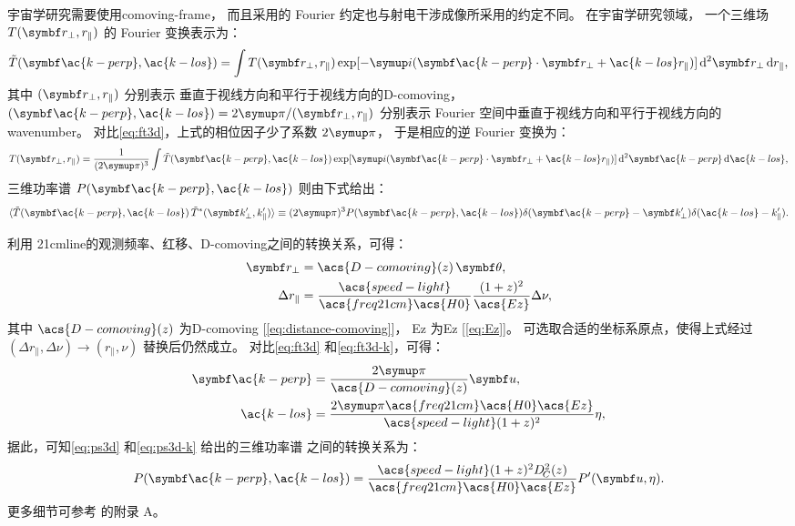 宇宙学研究需要使用\ac{comoving-frame}，
而且采用的 Fourier 约定也与射电干涉成像所采用的约定不同。
在宇宙学研究领域，
一个三维场 $T(\B{r}_{\perp}, r_{\parallel})$ 的 Fourier 变换表示为：
\begin{equation}
  \label{eq:ft3d-k}
  \tilde{T}(\B{\ac{k-perp}}, \ac{k-los}) =
    \int T(\B{r}_{\perp}, r_{\parallel})
    \exp[ -\Ci (\B{\ac{k-perp}} \cdot \B{r}_{\perp}
      + \ac{k-los} r_{\parallel}) ]
    \,\mathrm{d}^2\B{r}_{\perp} \,\D{r_{\parallel}} ,
\end{equation}
其中 $(\B{r}_{\perp}, r_{\parallel})$ 分别表示
垂直于视线方向和平行于视线方向的\acl{D-comoving}，
$(\B{\ac{k-perp}}, \ac{k-los}) = 2\Cpi / (\B{r}_{\perp}, r_{\parallel})$
分别表示 Fourier 空间中垂直于视线方向和平行于视线方向的\ac{wavenumber}。
对比\autoref{eq:ft3d}，上式的相位因子少了系数 $2\Cpi$，
于是相应的逆 Fourier 变换为：
\begin{equation}
  T(\B{r}_{\perp}, r_{\parallel}) =
    \frac{1}{(2\Cpi)^3} \int \tilde{T}(\B{\ac{k-perp}}, \ac{k-los})
    \exp[ \Ci (\B{\ac{k-perp}} \cdot \B{r}_{\perp}
      + \ac{k-los} r_{\parallel}) ]
    \,\mathrm{d}^2\B{\ac{k-perp}} \,\D{\ac{k-los}} ,
\end{equation}
三维功率谱 $P(\B{\ac{k-perp}}, \ac{k-los})$ 则由下式给出：
\begin{equation}
  \label{eq:ps3d-k}
  \langle \tilde{T}(\B{\ac{k-perp}}, \ac{k-los})
      \, \tilde{T}^*(\B{k}'_{\perp}, k'_{\parallel}) \rangle
    \equiv (2\Cpi)^3 P(\B{\ac{k-perp}}, \ac{k-los})
      \delta(\B{\ac{k-perp}} - \B{k}'_{\perp})
      \delta(\ac{k-los} - k'_{\parallel}) .
\end{equation}

利用 \ac{21cmline}的观测频率、红移、\acl{D-comoving}之间的转换关系，可得：
\begin{align}
  \B{r}_{\perp} & = \acs{D-comoving}(z) \,\B{\theta} , \\
  \Delta r_{\parallel}
    & = \frac{\acs{speed-light}}{\acs{freq21cm} \acs{H0}}
      \frac{(1+z)^2}{\acs{Ez}} \Delta \nu ,
\end{align}
其中 $\acs{D-comoving}(z)$ 为\acl{D-comoving}
[\autoref{eq:distance-comoving}]，
\acs{Ez} 为\acl{Ez} [\autoref{eq:Ez}]。
可选取合适的坐标系原点，使得上式经过
$(\Delta r_{\parallel}, \Delta\nu) \to (r_{\parallel}, \nu)$
替换后仍然成立。
对比\autoref{eq:ft3d} 和\autoref{eq:ft3d-k}，可得：
\begin{align}
  \B{\ac{k-perp}} & = \frac{2\Cpi}{\acs{D-comoving}(z)} \B{u} ,
  \label{eq:kperp-u}  \\
  \ac{k-los} & =
    \frac{2\Cpi \acs{freq21cm} \acs{H0}\acs{Ez}}{\acs{speed-light}
      (1+z)^2} \eta ,
  \label{eq:klos-eta}
\end{align}
据此，可知\autoref{eq:ps3d} 和\autoref{eq:ps3d-k} 给出的三维功率谱
之间的转换关系为：
\begin{equation}
  P(\B{\ac{k-perp}}, \ac{k-los}) =
    \frac{\acs{speed-light} (1+z)^2 D_{\!C}^2(z)}{
      \acs{freq21cm} \acs{H0} \acs{Ez}}
    P'(\B{u}, \eta) .
\end{equation}
更多细节可参考  的附录 A。

